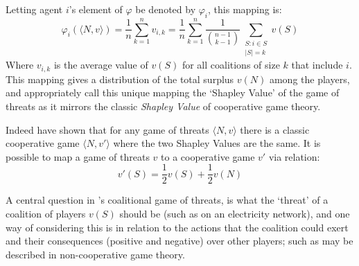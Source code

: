 Letting agent $i$'s element of $\varphi$ be denoted by $\varphi_i$, this mapping is:
\begin{equation}\label{da_value_eq} 
\varphi_i(\langle N,v\rangle)
= \frac{1}{n}\sum_{k=1}^n v_{i,k} 
= \frac{1}{n}\sum_{k=1}^n \frac{1}{\binom{n-1}{k-1}} \sum_{\substack{S:i\in S \\ |S|=k}}v(S) 
\end{equation}
Where $v_{i,k}$ is the average value of $v(S)$ for all coalitions of size $k$ that include $i$.
This mapping gives a distribution of the total surplus $v(N)$ among the players, and \cite{KOHLBERG2018139} appropriately call this unique mapping the `Shapley Value' of the game of threats as it mirrors the classic \textit{Shapley Value} of cooperative game theory.

Indeed \cite{KOHLBERG2018139} have shown that for any game of threats $\langle N,v\rangle$ there is a classic cooperative game $\langle N,v'\rangle$ where the two Shapley Values are the same.
It is possible to map a game of threats $v$ to a cooperative game $v'$ via relation:
\begin{equation}\label{convert1}
v'(S)=\frac{1}{2}v(S)+\frac{1}{2}v(N)
\end{equation}

A central question in \cite{KOHLBERG2018139}'s coalitional game of threats, is what the `threat' of a coalition of players $v(S)$ should be (such as on an electricity network), and one way of considering this is in relation to the actions that the coalition could exert and their consequences (positive and negative) over other players; such as may be described in non-cooperative game theory.

